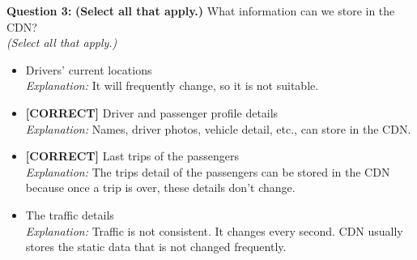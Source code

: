 \vspace{0.3cm}
\noindent
\textbf{Question 3:} \textbf{(Select all that apply.)} What information can we store in the CDN?
\\
\textit{(Select all that apply.)}
\\[0.2cm]
\begin{itemize}
 \item Drivers' current locations
\\[0.1cm]
\textit{Explanation:} 
It will frequently change, so it is not suitable.
 \item \textbf{[CORRECT]} Driver and passenger profile details
\\[0.1cm]
\textit{Explanation:} 
Names, driver photos, vehicle detail, etc., can store in the CDN.
 \item \textbf{[CORRECT]} Last trips of the passengers
\\[0.1cm]
\textit{Explanation:} 
The trips detail of the passengers can be stored in the CDN because once a trip is over, these details don't change.
 \item The traffic details
\\[0.1cm]
\textit{Explanation:} 
Traffic is not consistent. It changes every second. CDN usually stores the static data that is not changed frequently.
\end{itemize}

